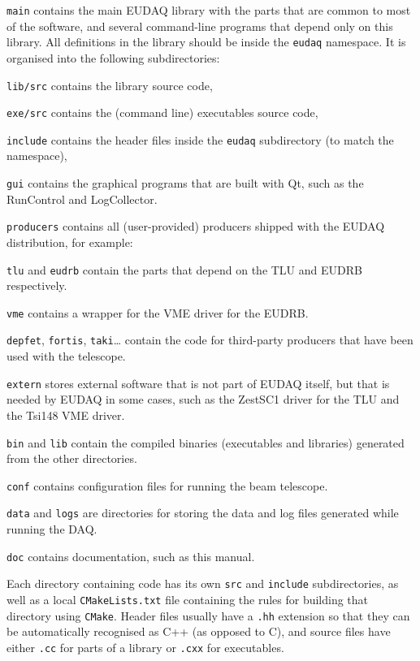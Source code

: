 \begin{myitemize}
\item \texttt{main}
  contains the main EUDAQ library with the parts that are common to most of the software,
  and several command-line programs that depend only on this library.
  All definitions in the library should be inside the \texttt{eudaq} namespace.
  It is organised into the following subdirectories:
  \begin{myitemize}
  \item \texttt{lib/src}
    contains the library source code,
  \item \texttt{exe/src}
    contains the (command line) executables source code,
  \item \texttt{include}
    contains the header files inside the \texttt{eudaq} subdirectory (to match the namespace),
  \end{myitemize}
\item \texttt{gui}
  contains the graphical programs that are built with Qt, such as the RunControl and LogCollector.
\item \texttt{producers}
  contains all (user-provided) producers shipped with the EUDAQ
  distribution, for example:
  \begin{myitemize}
\item \texttt{tlu} and \texttt{eudrb}
  contain the parts that depend on the \gls{TLU} and \gls{EUDRB} respectively.
\item\texttt{vme}
  contains a wrapper for the VME driver for the \gls{EUDRB}.
\item \texttt{depfet}, \texttt{fortis}, \texttt{taki}\ldots{}
  contain the code for third-party producers that have been used with
  the telescope.
  \end{myitemize}
\item \texttt{extern}
  stores external software that is not part of EUDAQ itself, but that is needed by EUDAQ in some cases,
  such as the ZestSC1 driver for the \gls{TLU} and the Tsi148 VME driver.
\item \texttt{bin} and \texttt{lib}
  contain the compiled binaries (executables and libraries) generated from the other directories.
\item \texttt{conf}
  contains configuration files for running the beam telescope.
\item \texttt{data} and \texttt{logs}
  are directories for storing the data and log files generated while running the DAQ.
\item \texttt{doc}
  contains documentation, such as this manual.
\end{myitemize}

Each directory containing code has its own \texttt{src} and \texttt{include} subdirectories,
as well as a local \texttt{CMakeLists.txt} file containing the rules
for building that directory using \texttt{CMake}.
Header files usually have a \texttt{.hh} extension so that they can be automatically recognised as C++
(as opposed to C), and source files have either \texttt{.cc} for parts of a library or \texttt{.cxx} for executables.
